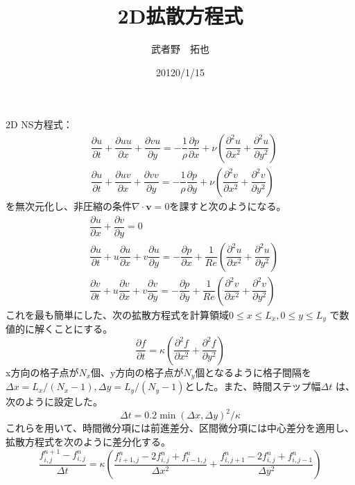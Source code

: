 \documentclass[a4paper,dvipdfmx]{jsarticle}%
\title{2D拡散方程式}
\author{武者野　拓也}
\date{20120/1/15}
\begin{document}
  \maketitle
  2D NS方程式：
  \begin{align}
    &\dfrac{\partial u}{\partial t} + \dfrac{\partial uu}{\partial x} + \dfrac{\partial vu}{\partial y} = -
    \dfrac{1}{\rho}\dfrac{\partial p}{\partial x} + \nu \left(\dfrac{\partial^2 u}{\partial x^2} + \dfrac{\partial^2 u}{\partial y^2}\right)\\
    &\dfrac{\partial u}{\partial t} + \dfrac{\partial uv}{\partial x} + \dfrac{\partial vv}{\partial y} = -\dfrac{1}{\rho}\dfrac{\partial p}{\partial y} + \nu \left(\dfrac{\partial^2 v}{\partial x^2} + \dfrac{\partial^2 v}{\partial y^2}\right)
  \end{align}
  を無次元化し、非圧縮の条件\(\nabla \cdot \bm{v} = 0\)を課すと次のようになる。
  \begin{align}
    &\dfrac{\partial u}{\partial x} + \dfrac{\partial v}{\partial y} = 0\\
    &\dfrac{\partial u}{\partial t} + u\dfrac{\partial u}{\partial x} + v\dfrac{\partial u}{\partial y} = - \dfrac{\partial p}{\partial x} + \dfrac{1}{Re}\left( \dfrac{\partial^2 u}{\partial x^2} + \dfrac{\partial^2 u}{\partial y^2} \right)\\
    &\dfrac{\partial v}{\partial t} + u\dfrac{\partial v}{\partial x} + v\dfrac{\partial v}{\partial y} = - \dfrac{\partial p}{\partial y} + \dfrac{1}{Re}\left( \dfrac{\partial^2 v}{\partial x^2} + \dfrac{\partial^2 v}{\partial y^2} \right)
  \end{align}
  これを最も簡単にした、次の拡散方程式を計算領域\( 0 \leq x \leq L_x, 0 \leq y \leq L_y \) で数値的に解くことにする。
  \begin{equation}
    \dfrac{\partial f}{\partial t} = \kappa \left( \dfrac{\partial^2 f}{\partial x^2} + \dfrac{\partial^2 f}{\partial y^2} \right)
  \end{equation}
  x方向の格子点が\(N_x\)個、y方向の格子点が\(N_y\)個となるように格子間隔を\( \Delta x = L_x/(N_x-1), \Delta y = L_y/(N_y-1) \)とした。また、時間ステップ幅\(\Delta t\) は、次のように設定した。
  \begin{equation}
    \Delta t = 0.2 \min(\Delta x, \Delta y)^2 /\kappa
  \end{equation}
  これらを用いて、時間微分項には前進差分、区間微分項には中心差分を適用し、拡散方程式を次のように差分化する。
  \begin{equation}
    \dfrac{f_{i,j}^{n+1} - f_{i,j}^n}{\Delta t} = \kappa \left( \dfrac{f_{i+1,j}^n - 2f_{i,j}^n + f_{i-1,j}^n}{\Delta x^2} + \dfrac{f_{i,j+1}^n - 2f_{i,j}^n + f_{i,j-1}^n}{\Delta y^2} \right)
  \end{equation}
\end{document}

